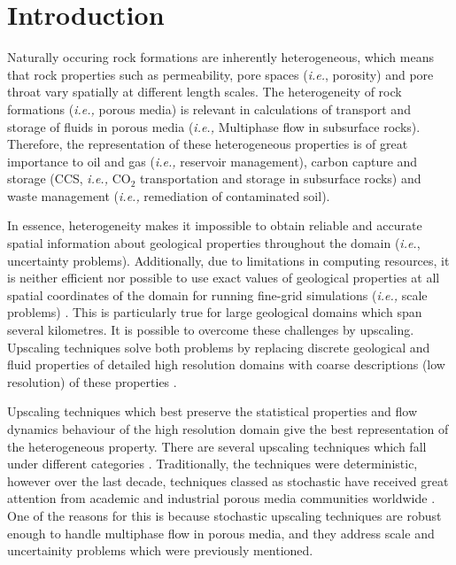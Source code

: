 \documentclass[preprint,12pt]{elsarticle}
\newcommand{\ie}{{\it i.e., }}
\begin{document}
\section{Introduction}\label{section:intro}
Naturally occuring rock formations are inherently heterogeneous, which means that rock properties such as permeability, pore spaces ({\it i.e.}, porosity) and pore throat vary spatially at different length scales. The heterogeneity of rock formations (\ie porous media) is relevant in calculations of transport and storage of fluids in porous media (\ie Multiphase flow in subsurface rocks). Therefore, the representation of these heterogeneous properties is of great importance to oil and gas (\ie reservoir management), carbon capture and storage (CCS, \ie CO$_2$ transportation and storage in subsurface rocks) and waste management (\ie remediation of contaminated soil).

In essence, heterogeneity makes it impossible to obtain reliable and accurate spatial information about geological properties throughout the domain ({\it i.e.}, uncertainty problems). Additionally, due to limitations in computing resources, it is neither efficient nor possible to use exact values of geological properties at all spatial coordinates of the domain for running fine-grid simulations (\ie scale problems) \cite{chen_2006,miller_1998,Renard_1997}. This is particularly true for large geological domains which span several kilometres. It is possible to overcome these challenges by upscaling. Upscaling techniques solve both problems by replacing discrete geological and fluid properties of detailed high resolution domains with coarse descriptions (low resolution) of these properties \cite{Vereecken_2007}.

Upscaling techniques which best preserve the statistical properties and flow dynamics behaviour of the high resolution domain give the best representation of the heterogeneous property. There are several upscaling techniques which fall under different categories \cite{Hasting_2001, Renard_1997, Szymkiewicz_2013}. Traditionally, the techniques were deterministic, however over the last decade, techniques classed as stochastic have received great attention from academic and industrial porous media communities worldwide \cite{Guilleminot_2012, Ravalec-Dupin_2010, Verwoerd_2009}. One of the reasons for this is because stochastic upscaling techniques are robust enough to handle multiphase flow in porous media, and they address scale and uncertainity problems which were previously mentioned.
\end{document}
